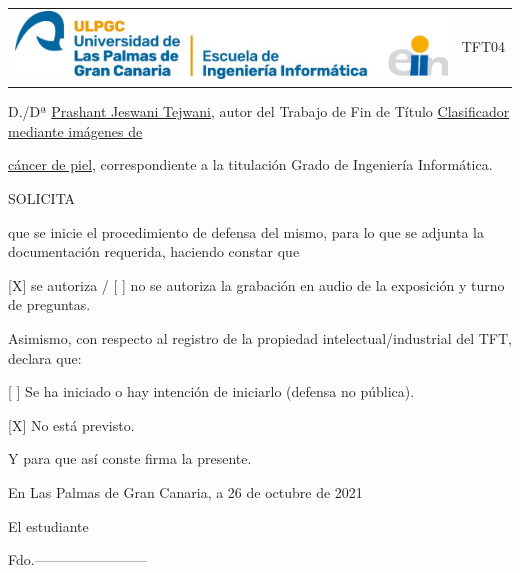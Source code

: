 
\pagestyle{empty}

\begin{tabular}{p{15cm}p{5cm}}
  \includegraphics{0_frontmatter/figures/LogoEII.jpg}   &  TFT04\\
\end{tabular}

\vspace{1em}
\fboxrule=2pt
\begin{center}
\end{center}

\vspace{1em}
\justify
D./Dª \underline{Prashant Jeswani Tejwani}, autor del Trabajo de Fin de Título \underline{Clasificador mediante imágenes de}

\underline{cáncer de piel}, correspondiente a la titulación Grado de Ingeniería Informática.

\vspace{1em}
SOLICITA

\vspace{1em}
que se inicie el procedimiento de defensa del mismo, para lo que se adjunta la documentación requerida, haciendo constar que 
\vspace{1em}

\hspace{10mm} [X] se autoriza / [ ] no se autoriza la grabación en audio de la exposición y turno de preguntas.

\vspace{1em}
Asimismo, con respecto al registro de la propiedad intelectual/industrial del TFT, declara que:
\vspace{1em}

\hspace{10mm} [ ] Se ha iniciado o hay intención de iniciarlo (defensa no pública).

\hspace{10mm} [X] No está previsto.

\vspace{1em}
Y para que así conste firma la presente. 

\begin{center}
En Las Palmas de Gran Canaria, a 26 de octubre de 2021

\vspace{1em}
El estudiante

\vspace{3em}
Fdo.------------------------
\end{center}

